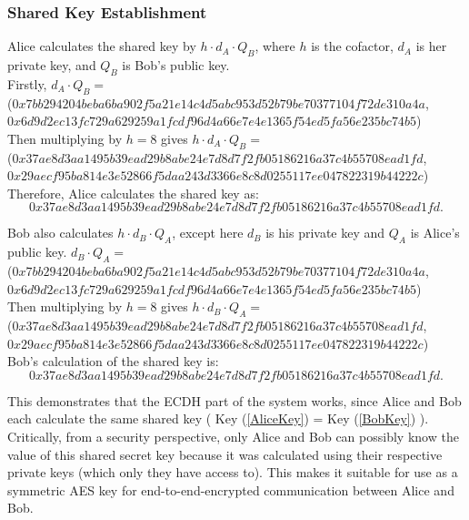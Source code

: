 \documentclass[12pt,a4paper]{article}
\begin{document}
\subsubsection{Shared Key Establishment} \noindent
Alice calculates the shared key by $h \cdot d_A \cdot Q_B$, 
where $h$ is the cofactor, $d_A$ is her private key, and $Q_B$ is Bob's public key. \\
Firstly, $d_A \cdot Q_B = $\\
({\footnotesize $0x7bb294204beba6ba902f5a21e14c4d5abc953d52b79be70377104f72de310a4a$}, \\
{\footnotesize $0x6d9d2ec13fc729a629259a1fcdf96d4a66e7e4e1365f54ed5fa56e235bc74b5$}) \\
Then multiplying by $h = 8$ gives $h \cdot d_A \cdot Q_B = $\\
({\footnotesize $0x37ae8d3aa1495b39ead29b8abe24e7d8d7f2fb05186216a37c4b55708ead1fd$}, \\
{\footnotesize $0x29aecf95ba814e3e52866f5daa243d3366e8c8d0255117ee047822319b44222c$}) \\
Therefore, Alice calculates the shared key as: 
\begin{equation} \label{AliceKey}
    0x37ae8d3aa1495b39ead29b8abe24e7d8d7f2fb05186216a37c4b55708ead1fd.
\end{equation}

Bob also calculates $h \cdot d_B \cdot Q_A$, except here $d_B$ is his private key and $Q_A$ is Alice's public key. 
$d_B \cdot Q_A = $ \\
({\footnotesize $0x7bb294204beba6ba902f5a21e14c4d5abc953d52b79be70377104f72de310a4a$}, \\
{\footnotesize $0x6d9d2ec13fc729a629259a1fcdf96d4a66e7e4e1365f54ed5fa56e235bc74b5$}) \\
Then multiplying by $h = 8$ gives $h \cdot d_B \cdot Q_A = $\\
({\footnotesize $0x37ae8d3aa1495b39ead29b8abe24e7d8d7f2fb05186216a37c4b55708ead1fd$}, \\
{\footnotesize $0x29aecf95ba814e3e52866f5daa243d3366e8c8d0255117ee047822319b44222c$}) \\
Bob's calculation of the shared key is: 
\begin{equation} \label{BobKey}
    0x37ae8d3aa1495b39ead29b8abe24e7d8d7f2fb05186216a37c4b55708ead1fd.
\end{equation}

This demonstrates that the ECDH part of the system works, since Alice and Bob each calculate the same shared key ( Key (\ref{AliceKey}) = Key (\ref{BobKey}) ). 
Critically, from a security perspective, only Alice and Bob can possibly know the value of this shared secret key 
because it was calculated using their respective private keys (which only they have access to). 
This makes it suitable for use as a symmetric AES key for end-to-end-encrypted communication between Alice and Bob. 
\end{document}
